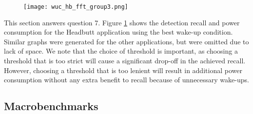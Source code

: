 \begin{figure}[h]
	\texttt{[image: wuc\_hb\_fft\_group3.png]}
	\caption{}
    \label{fig:wucHeadbuttFFTRecallPowerGroup3}
\end{figure}

This section answers question 7. Figure \ref{fig:wucHeadbuttFFTRecallPowerGroup3} shows the detection recall and power consumption for the Headbutt application using the best wake-up condition. Similar graphs were generated for the other applications, but were omitted due to lack of space. We note that the choice of threshold is important, as choosing a threshold that is too strict will cause a significant drop-off in the achieved recall. However, choosing a threshold that is too lenient will result in additional power consumption without any extra benefit to recall because of unnecessary wake-ups. 

\subsection{Macrobenchmarks}

